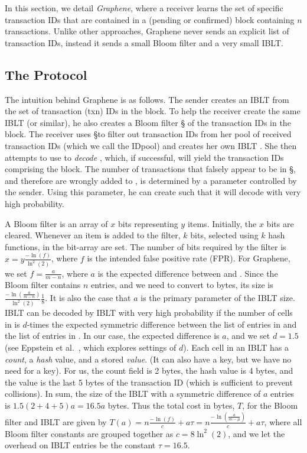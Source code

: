 In this section, we detail \emph{Graphene},
where a receiver 
learns the set of specific transaction IDs that are contained in a
(pending or confirmed) block containing $n$ transactions. Unlike other approaches, Graphene never  sends an explicit list of transaction IDs, instead it sends  a small Bloom filter and a very small IBLT.  



\subsection{The Protocol}
The intuition behind Graphene is as follows. The sender creates an IBLT \I
from the set of transaction (txn) IDs in the block. To help the receiver
create the same IBLT (or similar), he also creates a Bloom filter \S
of the transaction IDs in the block. The receiver uses \S to filter out
transaction IDs from her pool of received transaction IDs (which we call the IDpool) and creates her
own IBLT \Ip. She then attempts to use \Ip to \emph{decode} \I, which, if successful, will yield
the transaction IDs comprising the block. The number of transactions
that falsely appear to be in \S, and therefore are wrongly added to
\Ip, is determined by a parameter controlled by the sender. Using
this parameter, he can
create \I such that it will decode with very high probability.  %

A Bloom filter is an array of $x$ bits
representing $y$ items.  Initially, the $x$ bits are cleared. Whenever
an item is added to the filter, $k$ bits, selected using $k$ hash functions, in the bit-array are set. The number of bits
required by the filter is $x =y\frac{-\ln(f)}{\ln^2(2)}$, where $f$ is
the intended false positive rate (FPR).  For Graphene, we set $f=\frac{a}{m-n}$,
where $a$ is the expected difference between \I and \Ip .
Since the Bloom filter contains $n$ entries, and we need to convert to
bytes, its size is %
$\frac{-\ln(\frac{a}{m-n})}{\ln^2(2)}\frac18.$
%
It is also the case that $a$ is the primary parameter of the IBLT
size.  IBLT \I can be decoded by IBLT \Ip with very high probability
if the number of cells in \I is $d$-times the expected symmetric
difference between the list of entries in \I and the list of entries
in \Ip. In our case, the expected difference is $a$, and we set
$d=1.5$ (see Eppstein et al.~\cite{eppstein:2011}, which explores
settings of $d$). Each cell in an IBLT has a {\em count}, a {\em hash}
value, and a stored {\em value}.  (It can also have a key, but we have
no need for a key). For us, the count field is 2 bytes, the
hash value is 4 bytes, and the value is the last 5 bytes of the
transaction ID (which is sufficient to prevent collisions). In sum,
the size of the IBLT with a symmetric difference of $a$ entries is
$1.5(2+4+5)a=16.5a$ bytes.
%
Thus the total cost in bytes, $T$, for the Bloom filter and IBLT are
given by %
$T(a)= n\frac{-\ln(f)}{c}+ a\tau = n\frac{-\ln(\frac{a}{m-\mu})}{c}+ a\tau$, 
where all Bloom filter constants are grouped together as
$c=8\ln^2(2)$, and we let the overhead on IBLT entries be the constant
$\tau=16.5$.

